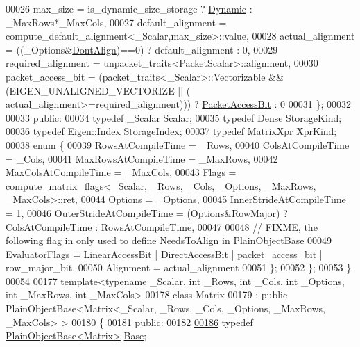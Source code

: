 \begin{DoxyCode}
00026       max\_size = is\_dynamic\_size\_storage ? \hyperlink{namespace_eigen_ad81fa7195215a0ce30017dfac309f0b2}{Dynamic} : \_MaxRows*\_MaxCols,
00027       default\_alignment = compute\_default\_alignment<\_Scalar,max\_size>::value,
00028       actual\_alignment = ((\_Options&\hyperlink{group__enums_ggaacded1a18ae58b0f554751f6cdf9eb13a40a452614141522dd313363dbbd65726}{DontAlign})==0) ? default\_alignment : 0,
00029       required\_alignment = unpacket\_traits<PacketScalar>::alignment,
00030       packet\_access\_bit = (packet\_traits<\_Scalar>::Vectorizable && (EIGEN\_UNALIGNED\_VECTORIZE || (
      actual\_alignment>=required\_alignment))) ? \hyperlink{group__flags_ga1a306a438e1ab074e8be59512e887b9f}{PacketAccessBit} : 0
00031     \};
00032     
00033 \textcolor{keyword}{public}:
00034   \textcolor{keyword}{typedef} \_Scalar Scalar;
00035   \textcolor{keyword}{typedef} Dense StorageKind;
00036   \textcolor{keyword}{typedef} \hyperlink{namespace_eigen_a62e77e0933482dafde8fe197d9a2cfde}{Eigen::Index} StorageIndex;
00037   \textcolor{keyword}{typedef} MatrixXpr XprKind;
00038   \textcolor{keyword}{enum} \{
00039     RowsAtCompileTime = \_Rows,
00040     ColsAtCompileTime = \_Cols,
00041     MaxRowsAtCompileTime = \_MaxRows,
00042     MaxColsAtCompileTime = \_MaxCols,
00043     Flags = compute\_matrix\_flags<\_Scalar, \_Rows, \_Cols, \_Options, \_MaxRows, \_MaxCols>::ret,
00044     Options = \_Options,
00045     InnerStrideAtCompileTime = 1,
00046     OuterStrideAtCompileTime = (Options&\hyperlink{group__enums_ggaacded1a18ae58b0f554751f6cdf9eb13acfcde9cd8677c5f7caf6bd603666aae3}{RowMajor}) ? ColsAtCompileTime : RowsAtCompileTime,
00047     
00048     \textcolor{comment}{// FIXME, the following flag in only used to define NeedsToAlign in PlainObjectBase}
00049     EvaluatorFlags = \hyperlink{group__flags_ga4b983a15d57cd55806df618ac544d09e}{LinearAccessBit} | \hyperlink{group__flags_gabf1e9d0516a933445a4c307ad8f14915}{DirectAccessBit} | packet\_access\_bit | 
      row\_major\_bit,
00050     Alignment = actual\_alignment
00051   \};
00052 \};
00053 \}
00054 
00177 \textcolor{keyword}{template}<\textcolor{keyword}{typename} \_Scalar, \textcolor{keywordtype}{int} \_Rows, \textcolor{keywordtype}{int} \_Cols, \textcolor{keywordtype}{int} \_Options, \textcolor{keywordtype}{int} \_MaxRows, \textcolor{keywordtype}{int} \_MaxCols>
00178 \textcolor{keyword}{class }Matrix
00179   : \textcolor{keyword}{public} PlainObjectBase<Matrix<\_Scalar, \_Rows, \_Cols, \_Options, \_MaxRows, \_MaxCols> >
00180 \{
00181   \textcolor{keyword}{public}:
00182 
\hyperlink{group___core___module_a9f405923954599ec7a71ee6bad2c53f1}{00186}     \textcolor{keyword}{typedef} \hyperlink{class_eigen_1_1_plain_object_base}{PlainObjectBase<Matrix>} \hyperlink{group___core___module_a9f405923954599ec7a71ee6bad2c53f1}{Base};

\end{DoxyCode}

